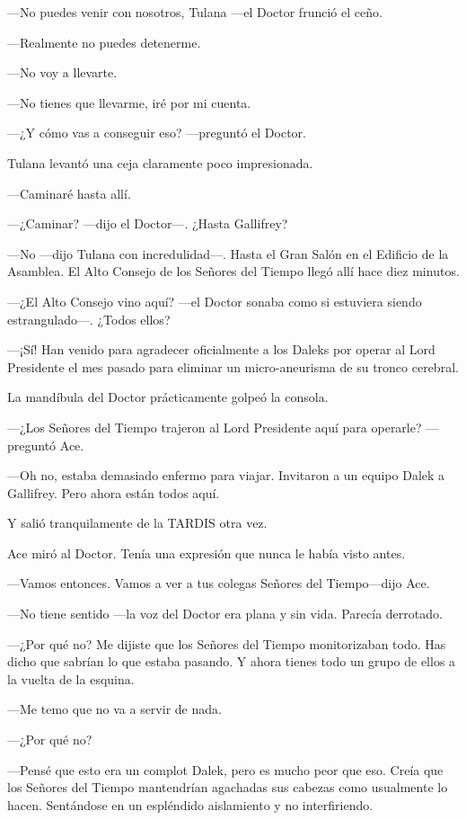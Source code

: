 ---No puedes venir con nosotros, Tulana ---el Doctor frunció el
ceño.

---Realmente no puedes detenerme.

---No voy a llevarte.

---No tienes que llevarme, iré por mi cuenta.

---¿Y cómo vas a conseguir eso? ---preguntó el Doctor.

Tulana levantó una ceja claramente poco impresionada.

---Caminaré hasta allí.

---¿Caminar? ---dijo el Doctor---. ¿Hasta Gallifrey?

---No ---dijo Tulana con incredulidad---. Hasta el Gran Salón en
el Edificio de la Asamblea. El Alto Consejo de los Señores del Tiempo
llegó allí hace diez minutos.

---¿El Alto Consejo vino aquí? ---el Doctor sonaba como si
estuviera siendo estrangulado---. ¿Todos ellos?

---¡Sí! Han venido para agradecer oficialmente a los Daleks por
operar al Lord Presidente el mes pasado para eliminar un micro-aneurisma
de su tronco cerebral.

La mandíbula del Doctor prácticamente golpeó la consola.

---¿Los Señores del Tiempo trajeron al Lord Presidente aquí para
operarle? ---preguntó Ace.

---Oh no, estaba demasiado enfermo para viajar. Invitaron a un
equipo Dalek a Gallifrey. Pero ahora están todos aquí.

Y salió tranquilamente de la TARDIS otra vez.

Ace miró al Doctor. Tenía una expresión que nunca le había visto
antes.

---Vamos entonces. Vamos a ver a tus colegas Señores del
Tiempo---dijo Ace.

---No tiene sentido ---la voz del Doctor era plana y sin vida.
Parecía derrotado.

---¿Por qué no? Me dijiste que los Señores del Tiempo
monitorizaban todo. Has dicho que sabrían lo que estaba pasando. Y ahora
tienes todo un grupo de ellos a la vuelta de la esquina.

---Me temo que no va a servir de nada.

---¿Por qué no?

---Pensé que esto era un complot Dalek, pero es mucho peor que
eso. Creía que los Señores del Tiempo mantendrían agachadas sus cabezas
como usualmente lo hacen. Sentándose en un espléndido aislamiento y no
interfiriendo.

